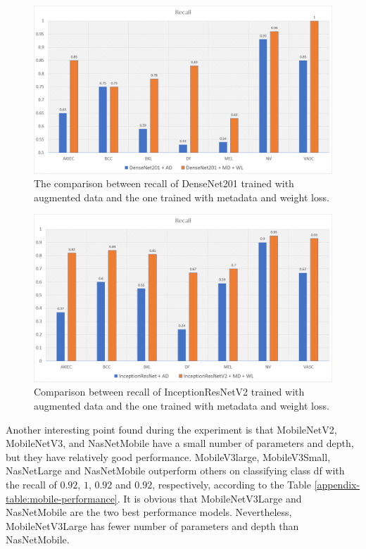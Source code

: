 \documentclass[sensors,article,accept,pdftex,moreauthors]{Definitions/mdpi}
\begin{document}
	\begin{figure}[H]
		\centering
		\includegraphics[width=1\linewidth]{Definitions/den re}
		\caption{The comparison between recall of DenseNet201 trained with augmented data and the one trained with metadata and weight loss.}
		\label{fig:den recall}
	\end{figure}\unskip
	
	\begin{figure}[H]
		\centering
		\includegraphics[width=1\linewidth]{Definitions/in re}
		\caption{Comparison between recall of InceptionResNetV2 trained with augmented data and the one trained with metadata and weight loss.}
		\label{fig:incep recall}
	\end{figure}
	
	Another interesting point found during the experiment is that MobileNetV2, MobileNetV3, and NasNetMobile have a small number of parameters and depth, but they have relatively good performance. MobileV3large, MobileV3Small, NasNetLarge and NasNetMobile outperform others on classifying class df with the recall of $0.92$, $1$, $0.92$ and  $0.92$, respectively, according to the Table \ref{appendix-table:mobile-performance}. It is obvious that MobileNetV3Large and NasNetMobile are the two best performance models. Nevertheless, MobileNetV3Large has fewer number of parameters and depth than NasNetMobile.
\end{document}
